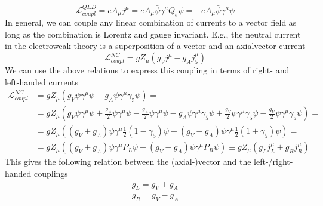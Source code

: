 \begin{equation*}
\mathcal{L}_{coupl}^{QED} = e A_ {\mu} j^{\mu} = e A_{\mu} \bar{\psi} \gamma^{\mu} Q_e \psi = -e A_{\mu} \bar{\psi} \gamma^{\mu} \psi 
\end{equation*}
In general, we can couple any linear combination of currents to a vector field as long as the combination is Lorentz and gauge invariant. E.g., the neutral current in the electroweak theory is a superposition of a vector and an axialvector current
\begin{equation*}
\mathcal{L}_{coupl}^{NC} = g Z_{\mu} \left( g_V j^{\mu} - g_A j^{\mu}_5 \right)
\end{equation*}
We can use the above relations to express this coupling in terms of right- and left-handed currents
\begin{align*}
\mathcal{L}_{coupl}^{NC} & = g Z_{\mu} \left( g_V \bar{\psi} \gamma^{\mu} \psi - g_A \bar{\psi} \gamma^{\mu} \gamma_5 \psi \right) = & \\
& = g Z_{\mu} \left( g_V \bar{\psi} \gamma^{\mu} \psi + \frac{g_A}{2} \bar{\psi} \gamma^{\mu} \psi - \frac{g_A}{2} \bar{\psi} \gamma^{\mu} \psi - g_A \bar{\psi} \gamma^{\mu} \gamma_5 \psi + \frac{g_V}{2} \bar{\psi} \gamma^{\mu} \gamma_5 \psi - \frac{g_V}{2} \bar{\psi} \gamma^{\mu} \gamma_5 \psi \right) = & \\
& = g Z_{\mu} \left( \left( g_V + g_A \right) \bar{\psi} \gamma^{\mu} \frac{1}{2} \left( 1 - \gamma_5 \right) \psi + \left( g_V - g_A \right) \bar{\psi} \gamma^{\mu} \frac{1}{2} \left( 1 + \gamma_5 \right) \psi \right) = & \\
& = g Z_{\mu} \left( \left( g_V + g_A \right) \bar{\psi} \gamma^{\mu} P_L \psi + \left( g_V - g_A \right) \bar{\psi} \gamma^{\mu} P_R \psi \right) \equiv g Z_{\mu} \left( g_L j^{\mu}_L + g_R j^{\mu}_R \right)  &
\end{align*}
This gives the following relation between the (axial-)vector and the left-/right-handed couplings
\begin{align*}
&g_L = g_V + g_A &\\
&g_R = g_V - g_A &
\end{align*}